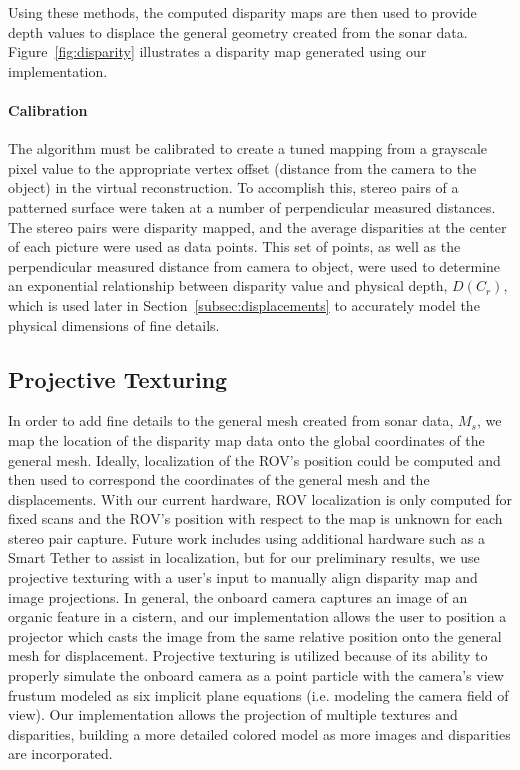 \documentclass{llncs}
\begin{document}
Using these methods, the computed disparity maps are then used to provide depth values to displace the general geometry created from the sonar data. Figure~\ref{fig:disparity} illustrates a disparity map generated using our implementation.

\paragraph{Calibration}
The algorithm must be calibrated to create a tuned mapping from a grayscale pixel value to the appropriate vertex offset (distance from the camera to the object) in the virtual reconstruction. To accomplish this, stereo pairs of a patterned surface were taken at a number of perpendicular measured distances. The stereo pairs were disparity mapped, and the average disparities at the center of each picture were used as data points. This set of points, as well as the perpendicular measured distance from camera to object, were used to determine an exponential relationship between disparity value and physical depth, $D(C_r)$, which is used later in Section~\ref{subsec:displacements} to accurately model the physical dimensions of fine details.

\subsection{Projective Texturing}
\label{subsec:projectiveTexturing}
\noindent In order to add fine details to the general mesh created from sonar data, $M_s$, we map the location of the disparity map data onto the global coordinates of the general mesh. Ideally, localization of the ROV's position could be computed and then used to correspond the coordinates of the general mesh and the displacements. With our current hardware, ROV localization is only computed for fixed scans and the ROV's position with respect to the map is unknown for each stereo pair capture. Future work includes using additional hardware such as a Smart Tether to assist in localization, but for our preliminary results, we use projective texturing with a user's input to manually align disparity map and image projections. In general, the onboard camera captures an image of an organic feature in a cistern, and our implementation allows the user to position a projector which casts the image from the same relative position onto the general mesh for displacement. Projective texturing is utilized because of its ability to properly simulate the onboard camera as a point particle with the camera's view frustum modeled as six implicit plane equations (i.e. modeling the camera field of view). Our implementation allows the projection of multiple textures and disparities, building a more detailed colored model as more images and disparities are incorporated.
\end{document}

